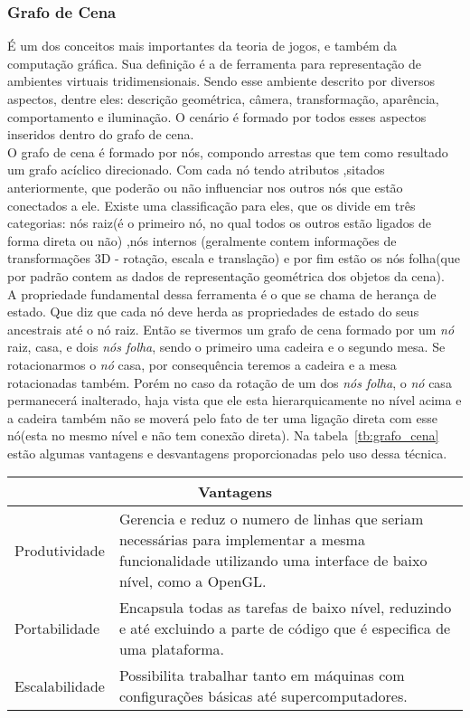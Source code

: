 \subsubsection{Grafo de Cena}
É um dos conceitos mais importantes da teoria de jogos, e também da computação gráfica. Sua definição é a de ferramenta para representação de ambientes virtuais tridimensionais. Sendo esse ambiente descrito por diversos aspectos, dentre eles: descrição geométrica, câmera, transformação, aparência, comportamento e iluminação\cite{ferreira}. O cenário é formado por todos esses aspectos inseridos dentro do grafo de cena. \\

O grafo de cena é formado por nós, compondo arrestas que tem como resultado um grafo acíclico direcionado. Com cada nó tendo atributos ,sitados anteriormente, que poderão ou não influenciar nos outros nós que estão conectados a ele. Existe uma classificação para eles, que os divide em três categorias: nós raiz(é o primeiro nó, no qual todos os outros estão ligados de forma direta ou não) ,nós internos (geralmente contem informações de transformações 3D - rotação, escala e translação) e por fim estão os nós folha(que por padrão contem as dados de representação geométrica dos objetos da cena).\\ 

A propriedade fundamental dessa ferramenta é o que se chama de herança de estado. Que diz que cada nó deve herda as propriedades de estado do seus ancestrais até o nó raiz. Então se tivermos um grafo de cena formado por um \textit{nó} raiz, casa, e dois \textit{nós folha}, sendo o primeiro uma cadeira e o segundo mesa. Se rotacionarmos o \textit{nó} casa, por consequência teremos a cadeira e a mesa rotacionadas também. Porém no caso da rotação de um dos \textit{nós folha}, o \textit{nó} casa permanecerá inalterado, haja vista que ele esta hierarquicamente no nível acima e a cadeira também não se moverá pelo fato de ter uma ligação direta com esse nó(esta no mesmo nível e não tem conexão direta). Na tabela~\ref{tb:grafo_cena} estão algumas vantagens e desvantagens proporcionadas pelo uso dessa técnica.\\

\begin{center}
\begin{tabular}{|p{3cm}|p{8cm}|}
	\hline
	\multicolumn{2}{|c|}{Vantagens} \\ \hline
	Produtividade &  Gerencia e reduz o numero de linhas que seriam necessárias para implementar
a mesma funcionalidade utilizando uma interface de baixo nível, como a OpenGL.\\ \hline
	Portabilidade &  Encapsula todas as tarefas de baixo nível, reduzindo e até 
excluindo a parte de código que é especifica de uma plataforma.\\ \hline
	Escalabilidade &  Possibilita trabalhar tanto em máquinas com configurações básicas até supercomputadores.\\ 
	\hline
\end{tabular}
\label{tb:grafo_cena}
\end{center}

